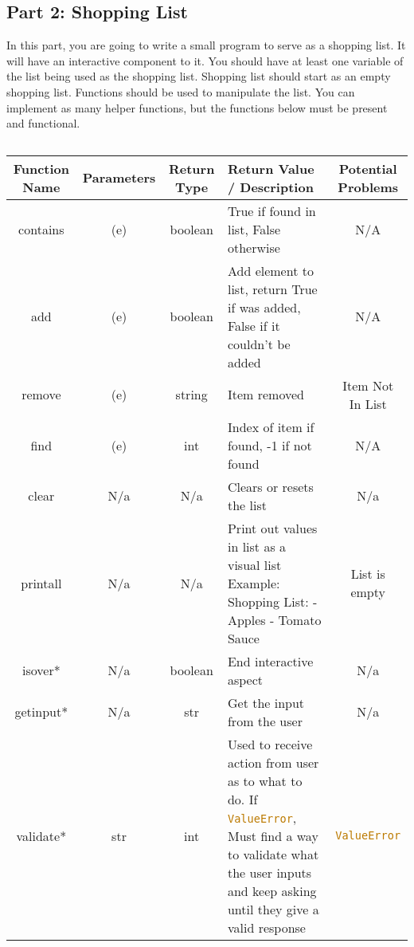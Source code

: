 \documentclass[12pt]{report}
\begin{document}
\newpage
\subsection*{Part 2: Shopping List}

In this part, you are going to write a small program to serve as a shopping list. 
It will have an interactive component to it. You should have at least one variable of the list being used as the shopping list.
Shopping list should start as an empty shopping list. Functions should be used to manipulate the list. You can implement as many helper functions, but the functions below must be present and functional.

${}$

\begin{tabular}{| c | c | c | L | c |}
    \hline
    Function Name & Parameters & Return Type & Return Value / Description & Potential Problems \\
    \hline
    contains & (e) & boolean & True if found in list, False otherwise & N/A \\
    \hline
    add & (e) & boolean & Add element to list, return True if was added, False if it couldn't be added & N/A \\
    \hline
    remove & (e) & string & Item removed & Item Not In List \\
    \hline
    find & (e) & int & Index of item if found, -1 if not found & N/A \\
    \hline
    clear & N/a & N/a & Clears or resets the list & N/a \\
    \hline
    printall & N/a & N/a & Print out values in list as a visual list \newline Example: \newline Shopping List: \newline - Apples \newline - Tomato Sauce & List is empty \\
    \hline
    isover* & N/a & boolean & End interactive aspect & N/a \\
    \hline
    getinput* & N/a & str & Get the input from the user & N/a \\
    \hline
    validate* & str & int & Used to receive action from user as to what to do. If \lstinline[language=Python]!ValueError!,  Must find a way to validate what the user inputs and keep asking until they give a valid response & \lstinline[language=Python]!ValueError! \\
    \hline
\end{tabular}
\end{document}
